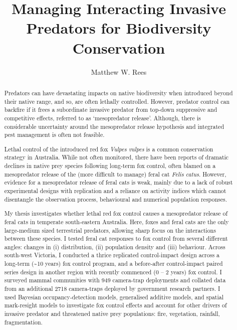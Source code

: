 \documentclass[11pt,a4paper,titlepage,twoside,openright]{style/unimelbthesis}
\title{Managing Interacting Invasive Predators for Biodiversity Conservation}
\author{Matthew W. Rees}
\begin{document}
\begin{frontmatter}


  \maketitle

  \begin{abstract}
    Predators can have devastating impacts on native biodiversity when introduced beyond their native range, and so, are often lethally controlled. However, predator control can backfire if it frees a subordinate invasive predator from top-down suppressive and competitive effects, referred to as `mesopredator release'. Although, there is considerable uncertainty around the mesopredator release hypothesis and integrated pest management is often not feasible.
    
    Lethal control of the introduced red fox \emph{Vulpes vulpes} is a common conservation strategy in Australia. While not often monitored, there have been reports of dramatic declines in native prey species following long-term fox control, often blamed on a mesopredator release of the (more difficult to manage) feral cat \emph{Felis catus}. However, evidence for a mesopredator release of feral cats is weak, mainly due to a lack of robust experimental designs with replication and a reliance on activity indices which cannot disentangle the observation process, behavioural and numerical population responses.
    
    My thesis investigates whether lethal red fox control causes a mesopredator release of feral cats in temperate south-eastern Australia. Here, foxes and feral cats are the only large-medium sized terrestrial predators, allowing sharp focus on the interactions between these species. I tested feral cat responses to fox control from several different angles: changes in (i) distribution, (ii) population density and (iii) behaviour. Across south-west Victoria, I conducted a thrice replicated control-impact design across a long-term (\textasciitilde10 years) fox control program, and a before-after control-impact paired series design in another region with recently commenced (0 -- 2 years) fox control. I surveyed mammal communities with 949 camera-trap deployments and collated data from an additional 2718 camera-traps deployed by government research partners. I used Bayesian occupancy-detection models, generalised additive models, and spatial mark-resight models to investigate fox control effects and account for other drivers of invasive predator and threatened native prey populations: fire, vegetation, rainfall, fragmentation.
    

\end{abstract}
\end{frontmatter}
\end{document}
